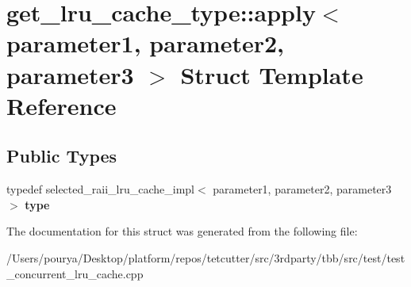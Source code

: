 \hypertarget{structget__lru__cache__type_1_1apply}{}\section{get\+\_\+lru\+\_\+cache\+\_\+type\+:\+:apply$<$ parameter1, parameter2, parameter3 $>$ Struct Template Reference}
\label{structget__lru__cache__type_1_1apply}
\subsection*{Public Types}
\begin{DoxyCompactItemize}
\item 
\hypertarget{structget__lru__cache__type_1_1apply_ad061a05cb0035eff426e060535596689}{}typedef selected\+\_\+raii\+\_\+lru\+\_\+cache\+\_\+impl$<$ parameter1, parameter2, parameter3 $>$ {\bfseries type}\label{structget__lru__cache__type_1_1apply_ad061a05cb0035eff426e060535596689}

\end{DoxyCompactItemize}


The documentation for this struct was generated from the following file\+:\begin{DoxyCompactItemize}
\item 
/\+Users/pourya/\+Desktop/platform/repos/tetcutter/src/3rdparty/tbb/src/test/test\+\_\+concurrent\+\_\+lru\+\_\+cache.\+cpp\end{DoxyCompactItemize}
